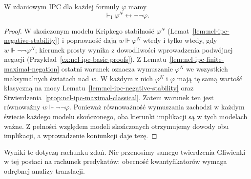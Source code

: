 \begin{wniosek}
\label{cor:ncl-ipc-negative-translation-equivalence}
W zdaniowym IPC dla każdej formuły $\varphi$ mamy
\[
 \vdash_{\mathrm I}\varphi^N\leftrightarrow\neg\neg\varphi.
\]
\end{wniosek}
\begin{proof}
W skończonym modelu Kripkego stabilność $\varphi^N$
(Lemat~\ref{lem:ncl-ipc-negative-stability}) i poprawność
dają $w\Vdash\varphi^N$ wtedy i tylko wtedy,
gdy $w\Vdash\neg\neg\varphi^N$; kierunek prosty
wynika z dowodliwości wprowadzenia podwójnej
negacji (Przykład~\ref{ex:ncl-ipc-basic-proofs}).
Z Lematu~\ref{lem:ncl-ipc-finite-maximal-negation}
ostatni warunek oznacza wymuszanie $\varphi^N$ we
wszystkich maksymalnych światach nad $w$.
W każdym z nich $\varphi^N$ i $\varphi$ mają tę samą
wartość klasyczną na mocy
Lematu~\ref{lem:ncl-ipc-negative-stability} oraz
Stwierdzenia~\ref{prop:ncl-ipc-maximal-classical}.
Zatem warunek ten jest równoważny
$w\Vdash\neg\neg\varphi$.
Ponieważ równoważność wymuszania zachodzi
w każdym świecie każdego modelu skończonego,
oba kierunki implikacji są w tych modelach ważne.
Z pełności względem modeli skończonych otrzymujemy
dowody obu implikacji, a wprowadzenie koniunkcji
daje tezę.
\end{proof}
Wyniki te dotyczą rachunku zdań. Nie przenosimy
samego twierdzenia Gliwienki w tej postaci na
rachunek predykatów: obecność kwantyfikatorów wymaga
odrębnej analizy translacji.
